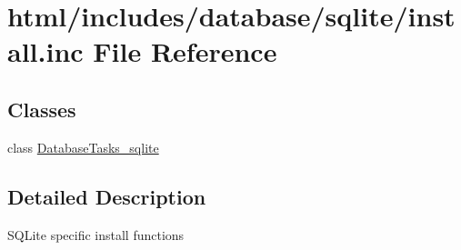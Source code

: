 \hypertarget{database_2sqlite_2install_8inc}{
\section{html/includes/database/sqlite/install.inc File Reference}
\label{database_2sqlite_2install_8inc}
}
\subsection*{Classes}
\begin{DoxyCompactItemize}
\item 
class \hyperlink{classDatabaseTasks__sqlite}{DatabaseTasks\_\-sqlite}
\end{DoxyCompactItemize}


\subsection{Detailed Description}
SQLite specific install functions 